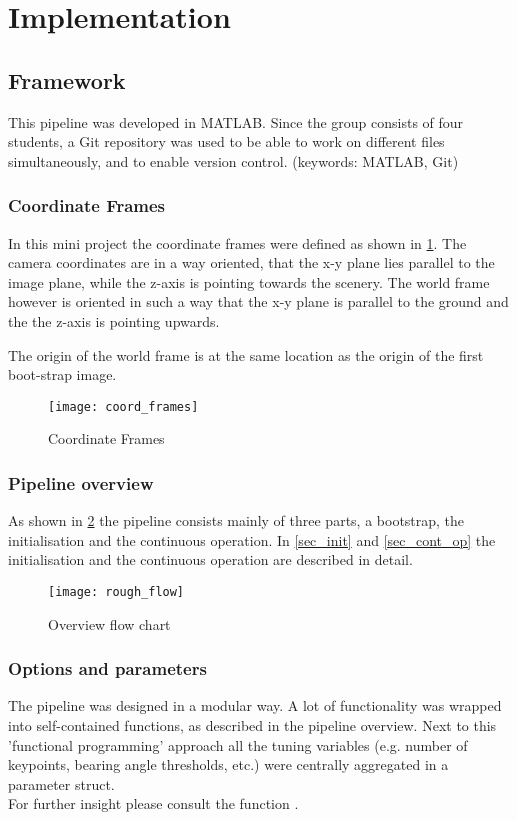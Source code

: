 \section{Implementation}

\subsection{Framework}
This pipeline was developed in MATLAB. Since the group consists of four students, a Git repository was used to be able to work on different files simultaneously, and to enable version control.
(keywords: MATLAB, Git)

\subsubsection{Coordinate Frames}
In this mini project the coordinate frames were defined as shown in \cref{img_coord_frames}. The camera coordinates are in a way oriented, that the x-y plane lies parallel to the image plane, while the z-axis is pointing towards the scenery. The world frame however is oriented in such a way that the x-y plane is parallel to the ground and the the z-axis is pointing upwards.

The origin of the world frame is at the same location as the origin of the first boot-strap image.

\begin{figure}[ht]
	\centering
	\texttt{[image: coord\_frames]}
	\caption{Coordinate Frames}
	\label{img_coord_frames}
\end{figure}

\subsubsection{Pipeline overview}

As shown in \cref{img_flow_rough} the pipeline consists mainly of three parts, a bootstrap, the initialisation and the continuous operation. In \cref{sec_init} and \cref{sec_cont_op} the initialisation and the continuous operation are described in detail.

\begin{figure}[ht]
	\centering
	\texttt{[image: rough\_flow]}
	\caption{Overview flow chart}
	\label{img_flow_rough}
\end{figure}

%

\subsubsection{Options and parameters}
The pipeline was designed in a modular way. A lot of functionality was wrapped into self-contained functions, as described in the pipeline overview. Next to this 'functional programming' approach all the tuning variables (e.g. number of keypoints, bearing angle thresholds, etc.) were centrally aggregated in a parameter struct.\\
For further insight please consult the function .\\

